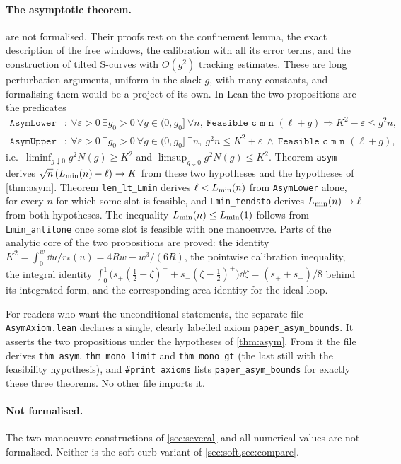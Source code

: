\paragraph{The asymptotic theorem.}
 are not formalised.
Their proofs rest on the confinement lemma, the exact description of the free windows, the calibration with all its error terms, and the construction of tilted S-curves with $O(g^2)$ tracking estimates.
These are long perturbation arguments, uniform in the slack $g$, with many constants, and formalising them would be a project of its own.
In Lean the two propositions are the predicates
\begin{align*}
  \texttt{AsymLower c m}&:\ \forall\varepsilon>0\ \exists g_0>0\ \forall g\in(0,g_0]\ \forall n,\ \texttt{Feasible c m n }(\ell+g)\Rightarrow K^2-\varepsilon\le g^2n,\\
  \texttt{AsymUpper c m}&:\ \forall\varepsilon>0\ \exists g_0>0\ \forall g\in(0,g_0]\ \exists n,\ g^2n\le K^2+\varepsilon\ \wedge\ \texttt{Feasible c m n }(\ell+g),
\end{align*}
i.e.\ $\liminf_{g\downarrow0}g^2N(g)\ge K^2$ and $\limsup_{g\downarrow0}g^2N(g)\le K^2$.
Theorem \texttt{asym} derives $\sqrt n\,(L_{\min}(n)-\ell)\to K$ from these two hypotheses and the hypotheses of \cref{thm:asym}.
Theorem \texttt{len\_lt\_Lmin} derives $\ell<L_{\min}(n)$ from \texttt{AsymLower} alone, for every $n$ for which some slot is feasible, and \texttt{Lmin\_tendsto} derives $L_{\min}(n)\to\ell$ from both hypotheses.
The inequality $L_{\min}(n)\le L_{\min}(1)$ follows from \texttt{Lmin\_antitone} once some slot is feasible with one manoeuvre.
Parts of the analytic core of the two propositions are proved: the identity $K^2=\int_0^w\dd u/r_*(u)=4Rw-w^3/(6R)$, the pointwise calibration inequality, the integral identity $\int_0^1\big(s_+(\frac12-\zeta)^++s_-(\zeta-\frac12)^+\big)\dd\zeta=(s_++s_-)/8$ behind its integrated form, and the corresponding area identity for the ideal loop.

For readers who want the unconditional statements, the separate file \texttt{AsymAxiom.lean} declares a single, clearly labelled axiom \texttt{paper\_asym\_bounds}.
It asserts the two propositions under the hypotheses of \cref{thm:asym}.
From it the file derives \texttt{thm\_asym}, \texttt{thm\_mono\_limit} and \texttt{thm\_mono\_gt} (the last still with the feasibility hypothesis), and \texttt{\#print axioms} lists \texttt{paper\_asym\_bounds} for exactly these three theorems.
No other file imports it.

\paragraph{Not formalised.}
The two-manoeuvre constructions of \cref{sec:several} and all numerical values are not formalised.
Neither is the soft-curb variant of \cref{sec:soft,sec:compare}.
